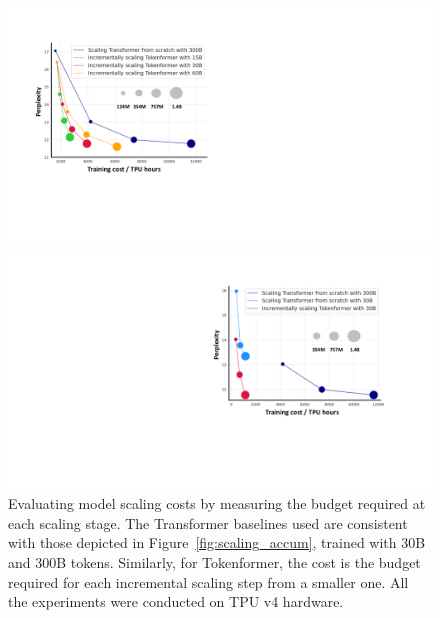 \documentclass{article} %
\newcommand{\ourmethod}{Tokenformer\xspace}
\begin{document}
\begin{figure}[h]
    \centering
    \begin{minipage}{0.49\linewidth}
        \centering
        \includegraphics[width=1.0\linewidth]{./main_results_v2_left.pdf}
        \vspace{-16pt}
        \caption{Evaluating model scaling costs through cumulative computational budgets. The Transformer baseline incurs expenses for each individual scaling step performed independently from scratch, whereas \ourmethod aggregates costs across all scaling stages, including training a 124M model initially, progressively scaling to 354M, 757M, and 1.4B parameters.}
        \label{fig:scaling_accum}
    \end{minipage}
    \hfill
    \begin{minipage}{0.49\linewidth}
        \centering
        \includegraphics[width=1.0\linewidth]{./main_results_v2_right.pdf}
        \vspace{-16pt}
        \caption{Evaluating model scaling costs by measuring the budget required at each scaling stage. The Transformer baselines used are consistent with those depicted in Figure~\ref{fig:scaling_accum}, trained with 30B and 300B tokens. Similarly, for \ourmethod, the cost is the budget required for each incremental scaling step from a smaller one. All the experiments were conducted on TPU v4 hardware.}
        \label{fig:scaling_individual}
    \end{minipage}
\end{figure}
\end{document}
